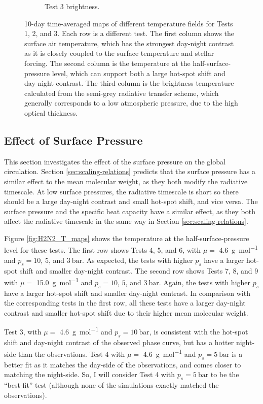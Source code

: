 \begin{figure}
\begin{subfigure}[t]{0.32\textwidth}
    \caption{Test 3 brightness.}
    \label{fig:free-h-shear}
  \end{subfigure}
  \caption{10-day time-averaged maps of different temperature fields for Tests 1, 2, and 3. Each row is a different test. The first column shows the surface air temperature, which has the strongest day-night contrast as it is closely coupled to the surface temperature and stellar forcing. The second column is the temperature at the half-surface-pressure level, which can support both a large hot-spot shift and day-night contrast. The third column is the brightness temperature calculated from the semi-grey radiative transfer scheme, which generally corresponds to a low atmospheric pressure, due to the high optical thickness.}
  \label{fig:Tlevels-maps}
\end{figure}




\subsection{Effect of Surface Pressure}\label{sec:ps_effect}

This section investigates the effect of the surface pressure on the global circulation. Section \ref{sec:scaling-relations} predicts that the surface pressure has a similar effect to the mean molecular weight, as they both modify the radiative timescale. At low surface pressures, the radiative timescale is short so there should be a large day-night contrast and small hot-spot shift, and vice versa. The surface pressure and the specific heat capacity have a similar effect, as they both affect the radiative timescale in the same way in Section \ref{sec:scaling-relations}.

Figure \ref{fig:H2N2_T_maps} shows the temperature at the half-surface-pressure level for these tests. The first row shows Tests 4, 5, and 6, with $\mu =$ \SI{4.6}{\gram\per\mole} and $p_{s} = 10$, $5$, and $3\ \mathrm{bar}$. As expected, the tests with higher $p_{s}$ have a larger hot-spot shift and smaller day-night contrast. The second row shows Tests 7, 8, and 9 with $\mu = $ \SI{15.0}{\gram\per\mole} and $p_{s} = 10$, $5$, and $3\ \mathrm{bar}$. Again, the tests with higher $p_{s}$ have a larger hot-spot shift and smaller day-night contrast. In comparison with the corresponding tests in the first row, all these tests have a larger day-night contrast and smaller hot-spot shift due to their higher mean molecular weight.

Test 3, with $\mu =$ \SI{4.6}{\gram\per\mole} and $p_{s} = 10\ \mathrm{bar}$, is consistent with the hot-spot shift and day-night contrast of the observed phase curve, but has a hotter night-side than the observations. Test 4 with $\mu =$ \SI{4.6}{\gram\per\mole} and $p_{s} = 5\ \mathrm{bar}$ is a better fit as it matches the day-side of the observations, and comes closer to matching the night-side. So, I will consider Test 4 with $p_{s} = 5\ \mathrm{bar}$ to be the ``best-fit'' test (although none of the simulations exactly matched the observations).

